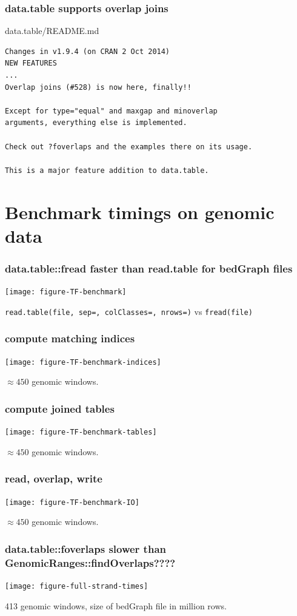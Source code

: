 \documentclass{beamer}
\begin{document}
\begin{frame}[fragile]
  \frametitle{data.table supports overlap joins}

data.table/README.md

\begin{verbatim}
Changes in v1.9.4 (on CRAN 2 Oct 2014)
NEW FEATURES
...
Overlap joins (#528) is now here, finally!! 

Except for type="equal" and maxgap and minoverlap 
arguments, everything else is implemented. 

Check out ?foverlaps and the examples there on its usage. 

This is a major feature addition to data.table.
\end{verbatim}

\end{frame}



\section{Benchmark timings on genomic data}

\begin{frame}
  \frametitle{data.table::fread faster than read.table for bedGraph
    files}
  \texttt{[image: figure-TF-benchmark]}

  \texttt{read.table(file, sep=, colClasses=, nrows=)} vs
  \texttt{fread(file)}
\end{frame}

\begin{frame}
  \frametitle{compute matching indices}
  \texttt{[image: figure-TF-benchmark-indices]}

  $\approx 450$ genomic windows.
\end{frame}

\begin{frame}
  \frametitle{compute joined tables}
  \texttt{[image: figure-TF-benchmark-tables]}

  $\approx 450$ genomic windows.
\end{frame}

\begin{frame}
  \frametitle{read, overlap, write}
  \texttt{[image: figure-TF-benchmark-IO]}

  $\approx 450$ genomic windows.
\end{frame}

\begin{frame}
  \frametitle{data.table::foverlaps slower than
    GenomicRanges::findOverlaps????}
  \texttt{[image: figure-full-strand-times]}

  413 genomic windows, size of bedGraph file in million rows.

\end{frame}
\end{document}
